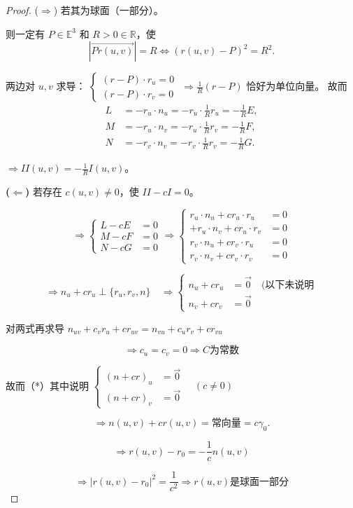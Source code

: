 \documentclass[lang=cn,10pt,thmcnt=section]{elegantbook}
\begin{document}
\begin{proof}
    ($\Rightarrow$) 若其为球面（一部分）。

则一定有 $P \in \mathbb{E}^3$ 和 $R > 0 \in \mathbb{R}$，使
$$
|\overrightarrow{Pr(u,v)}| = R \Leftrightarrow (r(u,v) - P)^2 = R^2.
$$

两边对 $u, v$ 求导：
$\begin{cases}
(r - P) \cdot r_u = 0 \\
(r - P) \cdot r_v = 0
\end{cases}$
$\Rightarrow \frac{1}{R}(r - P)$ 恰好为单位向量。
故而
\begin{align*}
L &= -r_u \cdot n_u = -r_u \cdot \frac{1}{R} r_u = -\frac{1}{R} E, \\
M &= -r_u \cdot n_v = -r_u \cdot \frac{1}{R} r_v = -\frac{1}{R} F, \\
N &= -r_v \cdot n_v = -r_v \cdot \frac{1}{R} r_v = -\frac{1}{R} G.
\end{align*}

$\Rightarrow II(u,v) = -\frac{1}{R} I(u,v)$。

\textbf{($\Leftarrow$)} 若存在 $c(u,v) \neq 0$，使 $II - cI = 0$。

$$
\Rightarrow \left\{
\begin{aligned}
L - cE &= 0 \\
M - cF &= 0 \\
N - cG &= 0
\end{aligned}
\right.
\Rightarrow \left\{
\begin{aligned}
r_u \cdot n_u + cr_u \cdot r_u &= 0 \\
+ r_u \cdot n_v + cr_u \cdot r_v &= 0 \\
r_v \cdot n_u + cr_v \cdot r_u &= 0 \\
r_v \cdot n_v + cr_v \cdot r_v &= 0
\end{aligned}
\right.
$$

$$
\Rightarrow n_u + cr_u \perp \{r_u, r_v, n\} \quad \Rightarrow \left\{
\begin{aligned}
n_u + cr_u &= \vec{0} \quad (\text{以下未说明} \\
n_v + cr_v &= \vec{0}
\end{aligned}
\right.
$$

对两式再求导 $n_{uv} + c_v r_u + c r_{uv} = n_{vu} + c_u r_v + c r_{vu}$

$$
\Rightarrow c_u = c_v = 0 \Rightarrow C \text{为常数}
$$

故而（*）其中说明 $\left\{
\begin{aligned}
(n + cr)_u &= \vec{0} \\
(n + cr)_v &= \vec{0}
\end{aligned}
\right. \quad (c \neq 0)$

$$
\Rightarrow n(u,v) + c r(u,v) = \text{常向量} = c \gamma_0.
$$

$$
\Rightarrow r(u,v) - r_0 = -\frac{1}{c} n(u,v)
$$

$$
\Rightarrow |r(u,v) - r_0|^2 = \frac{1}{c^2} \Rightarrow r(u,v) \text{是球面一部分}
$$

\end{proof}
\end{document}
